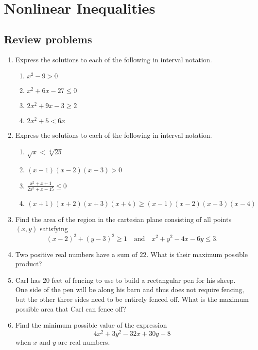 \section{Nonlinear Inequalities}

\subsection{Review problems}

\begin{enumerate}
\item Express the solutions to each of the following in interval notation.
\begin{enumerate}
\item $x^2 - 9 > 0$
\item $x^2 + 6x - 27\leq 0$
\item $2x^2 + 9x - 3\geq 2$
\item $2x^2 + 5 < 6x$
\end{enumerate}
\item Express the solutions to each of the following in interval notation.
\begin{enumerate}
\item $\sqrt{x} < \sqrt[4]{25}$
\item $(x - 1)(x - 2)(x - 3) > 0$
\item $\frac{x^2 + x + 1}{2x^2 + x - 15}\leq 0$
\item $(x + 1)(x + 2)(x + 3)(x + 4)\geq (x - 1)(x - 2)(x - 3)(x - 4)$
\end{enumerate}
\item Find the area of the region in the cartesian plane consisting of all points $(x,y)$ satisfying
\begin{equation*}
(x - 2)^2 + (y - 3)^2\geq 1\quad\text{and}\quad x^2 + y^2 - 4x - 6y\leq 3.
\end{equation*}
\item Two positive real numbers have a sum of $22$. What is their maximum possible product?
\item Carl has 20 feet of fencing to use to build a rectangular pen for his sheep. One side of the pen will be along his barn and thus does not require fencing, but the other three sides need to be entirely fenced off. What is the maximum possible area that Carl can fence off?
\item Find the minimum possible value of the expression
\begin{equation*}
4x^2 + 3y^2 - 32x + 30y - 8
\end{equation*}
when $x$ and $y$ are real numbers.
\end{enumerate}


